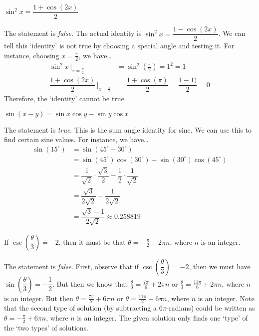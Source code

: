 \documentclass[11pt,letterpaper]{article}
\begin{document}
 $\sin^2 x= \dfrac{1 + \cos(2x)}{2}$ \pspace

\sol The statement is \textit{false}. The actual identity is $\sin^2 x= \dfrac{1 - \cos(2x)}{2}$. We can tell this `identity' is not true by choosing a special angle and testing it. For instance, choosing $x= \frac{\pi}{2}$, we have\dots
	\[
	\begin{aligned}
	\sin^2 x \,\bigg|_{x=\frac{\pi}{2}}&= \sin^2 \left( \frac{\pi}{2} \right)= 1^2= 1 \\[0.3cm]
	\dfrac{1 + \cos(2x)}{2} \,\bigg|_{x=\frac{\pi}{2}}&= \dfrac{1 + \cos(\pi)}{2}= \dfrac{1 - 1)}{2}= 0
	\end{aligned}
	\]
Therefore, the `identity' cannot be true. \pvspace{1.3cm}



 $\sin(x - y)= \sin x \cos y - \sin y \cos x$ \pspace

\sol The statement is \textit{true}. This is the sum angle identity for sine. We can use this to find certain sine values. For instance, we have\dots
	\[
	\begin{aligned}
	\sin(15^\circ)&= \sin(45^\circ - 30^\circ) \\[0.1cm]
	&= \sin(45^\circ) \cos(30^\circ) - \sin(30^\circ) \cos(45^\circ) \\[0.1cm]
	&= \dfrac{1}{\sqrt{2}} \cdot \dfrac{\sqrt{3}}{2} - \dfrac{1}{2} \cdot \dfrac{1}{\sqrt{2}} \\[0.1cm]
	&= \dfrac{\sqrt{3}}{2\sqrt{2}} - \dfrac{1}{2\sqrt{2}} \\[0.1cm]
	&= \dfrac{\sqrt{3} - 1}{2\sqrt{2}} \approx 0.258819
	\end{aligned}
	\] \pvspace{1.3cm}



 If $\csc \left( \dfrac{\theta}{3} \right)= -2$, then it must be that $\theta= -\frac{\pi}{2} + 2\pi n$, where $n$ is an integer. \pspace

\sol The statement is \textit{false}. First, observe that if $\csc \left( \dfrac{\theta}{3} \right)= -2$, then we must have $\sin \left( \dfrac{\theta}{3} \right)= -\dfrac{1}{2}$. But then we know that $\frac{\theta}{3}= \frac{7\pi}{6} + 2\pi n$ or $\frac{\theta}{3}= \frac{11\pi}{6} + 2\pi n$, where $n$ is an integer. But then $\theta= \frac{7\pi}{2} + 6 \pi n$ or $\theta= \frac{11\pi}{2} + 6 \pi n$, where $n$ is an integer. Note that the second type of solution (by subtracting a $6\pi$-radians) could be written as $\theta= -\frac{\pi}{2} + 6\pi n$, where $n$ is an integer. The given solution only finds one `type' of the `two types' of solutions. \pvspace{1.3cm}
\end{document}
